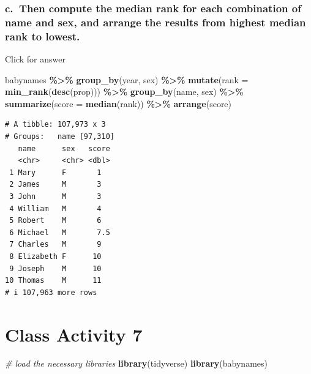 \documentclass[
]{book}
\newenvironment{Shaded}{\begin{snugshade}}{\end{snugshade}}
\newcommand{\AttributeTok}[1]{\textcolor[rgb]{0.13,0.29,0.53}{#1}}
\newcommand{\CommentTok}[1]{\textcolor[rgb]{0.56,0.35,0.01}{\textit{#1}}}
\newcommand{\FunctionTok}[1]{\textcolor[rgb]{0.13,0.29,0.53}{\textbf{#1}}}
\newcommand{\NormalTok}[1]{#1}
\newcommand{\SpecialCharTok}[1]{\textcolor[rgb]{0.81,0.36,0.00}{\textbf{#1}}}
\begin{document}
\hypertarget{c.-then-compute-the-median-rank-for-each-combination-of-name-and-sex-and-arrange-the-results-from-highest-median-rank-to-lowest.}{%
\subsection{c.~Then compute the median rank for each combination of name and sex, and arrange the results from highest median rank to lowest.}\label{c.-then-compute-the-median-rank-for-each-combination-of-name-and-sex-and-arrange-the-results-from-highest-median-rank-to-lowest.}}

Click for answer

\begin{Shaded}
\begin{Highlighting}[]
\NormalTok{babynames }\SpecialCharTok{\%\textgreater{}\%} 
  \FunctionTok{group\_by}\NormalTok{(year, sex) }\SpecialCharTok{\%\textgreater{}\%} 
  \FunctionTok{mutate}\NormalTok{(}\AttributeTok{rank =} \FunctionTok{min\_rank}\NormalTok{(}\FunctionTok{desc}\NormalTok{(prop))) }\SpecialCharTok{\%\textgreater{}\%}
  \FunctionTok{group\_by}\NormalTok{(name, sex) }\SpecialCharTok{\%\textgreater{}\%}
  \FunctionTok{summarize}\NormalTok{(}\AttributeTok{score =} \FunctionTok{median}\NormalTok{(rank)) }\SpecialCharTok{\%\textgreater{}\%}
  \FunctionTok{arrange}\NormalTok{(score) }
\end{Highlighting}
\end{Shaded}

\begin{verbatim}
# A tibble: 107,973 x 3
# Groups:   name [97,310]
   name      sex   score
   <chr>     <chr> <dbl>
 1 Mary      F       1  
 2 James     M       3  
 3 John      M       3  
 4 William   M       4  
 5 Robert    M       6  
 6 Michael   M       7.5
 7 Charles   M       9  
 8 Elizabeth F      10  
 9 Joseph    M      10  
10 Thomas    M      11  
# i 107,963 more rows
\end{verbatim}

\hypertarget{class-activity-7}{%
\chapter{Class Activity 7}\label{class-activity-7}}

\begin{Shaded}
\begin{Highlighting}[]
\CommentTok{\# load the necessary libraries}
\FunctionTok{library}\NormalTok{(tidyverse)}
\FunctionTok{library}\NormalTok{(babynames)}
\end{Highlighting}
\end{Shaded}
\end{document}
